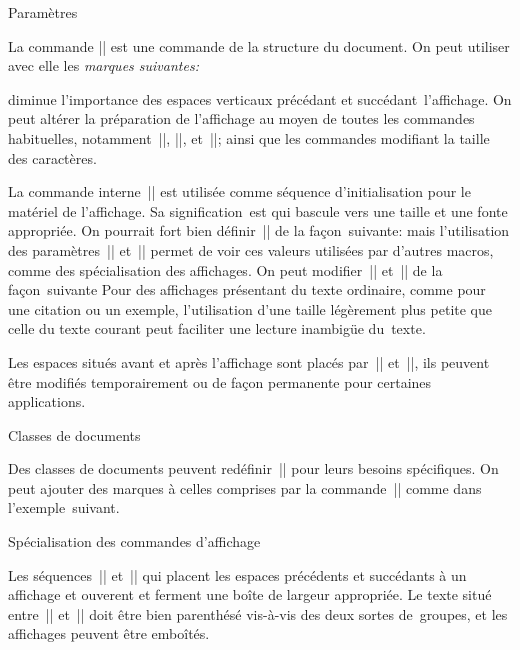 \formalpar Paramètres

La commande |\begindisplay| est une commande de la structure du
document. On peut utiliser avec elle les \em{marques} suivantes:
\begincslist
\item\compact
 diminue l'importance des espaces verticaux précédant et
 succédant~l'affichage.
\endcslist
On peut altérer la préparation de l'affichage au moyen de toutes les
commandes habituelles, notamment~|\emphasis|, |\literal|,
et~|\raggedleft|; ainsi que les commandes modifiant la taille des
caractères.

La commande interne~|\display@I| est utilisée comme séquence
d'initialisation pour le matériel de l'affichage. Sa signification~est
\begincode
\def\display@I{\displayfontsize\displayfont\fontselect}
\endcode
qui bascule vers une taille et une fonte appropriée. On pourrait fort
bien définir~|\display@I| de la façon~suivante:
\begincode
\def\display@I{\tenpoint\mainfont\fontselect}
\endcode
mais l'utilisation des paramètres~|\displayfontsize| et~|\displayfont|
permet de voir ces valeurs utilisées par d'autres macros, comme des
spécialisation des affichages. On peut modifier~|\displayfontsize|
et~|\displayfont| de la façon~suivante
\begincode
\let\displayfontsize=\ninepoint
\let\displayfont=\mainfont
\endcode
Pour des affichages présentant du texte ordinaire, comme pour une
citation ou un exemple, l'utilisation d'une taille légèrement plus
petite que celle du texte courant peut faciliter une lecture inambigüe
du~texte.


Les espaces situés avant et après l'affichage sont placés
par~|\displayopenskip| et~|\displaycloseskip|, ils peuvent être
modifiés temporairement ou de façon permanente pour certaines
applications.

\formalpar Classes de documents

Des classes de documents peuvent redéfinir~|\display@I| pour leurs
besoins spécifiques.
On peut ajouter des marques à celles comprises par la
commande~|\begindisplay| comme dans l'exemple~suivant.
\begincode
\displayoption{}
\endcode



\formalpar Spécialisation des commandes d'affichage

Les séquences~|\displayopen| et~|\displayclose| qui placent les
espaces précédents et succédants à un affichage et ouverent et ferment
une boîte de largeur appropriée. Le texte situé entre~|\displayopen|
et~|\displayclose| doit être bien parenthésé vis-à-vis des deux sortes
de~groupes, et les affichages peuvent être emboîtés.

